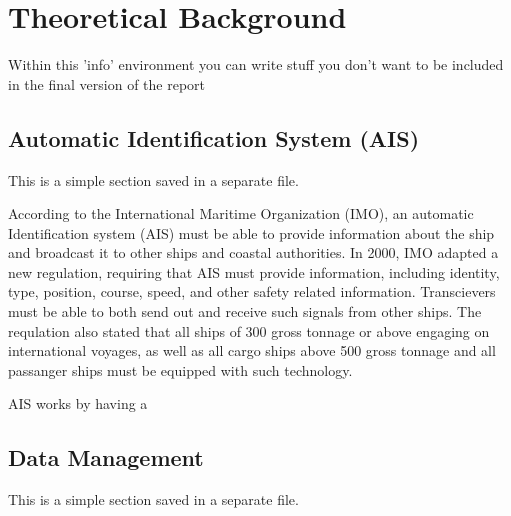 \chapter{Theoretical Background}
\label{chp:theory}
\begin{info}
	Within this 'info' environment you can write stuff you don't want to be included in the final version of the report
\end{info}

\section{Automatic Identification System (AIS)}
\label{sec:simple}
\begin{info}{}
	This is a simple section saved in a separate file.
\end{info}
According to the International Maritime Organization (IMO), an automatic Identification system (AIS) must be able to provide information about the ship and broadcast it to other ships and coastal authorities. In 2000, IMO adapted a new regulation, requiring that AIS must provide information, including identity, type, position, course, speed, and other safety related information. Transcievers must be able to both send out and receive such signals from other ships.  The requlation also stated that all ships of 300 gross tonnage or above engaging on international voyages, as well as all cargo ships above 500 gross tonnage and all passanger ships must be equipped with such technology. 


AIS works by having a 





\section{Data Management}
\label{sec:simple}
\begin{info}{}
	This is a simple section saved in a separate file.
\end{info}





